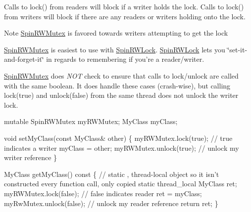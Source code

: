 Calls to lock() from readers will block if a writer holds the lock. Calls to lock() from writers will block if there are any readers or writers holding onto the lock.

\begin{DoxyNote}{Note}
\hyperlink{class_d_x_1_1_lock_free_1_1_spin_r_w_mutex}{Spin\-R\-W\-Mutex} is favored towards writers attempting to get the lock

\hyperlink{class_d_x_1_1_lock_free_1_1_spin_r_w_mutex}{Spin\-R\-W\-Mutex} is easiest to use with \hyperlink{class_d_x_1_1_lock_free_1_1_spin_r_w_lock}{Spin\-R\-W\-Lock}. \hyperlink{class_d_x_1_1_lock_free_1_1_spin_r_w_lock}{Spin\-R\-W\-Lock} lets you \char`\"{}set-\/it-\/and-\/forget-\/it\char`\"{} in regards to remembering if you're a reader/writer.

\hyperlink{class_d_x_1_1_lock_free_1_1_spin_r_w_mutex}{Spin\-R\-W\-Mutex} does {\itshape N\-O\-T} check to ensure that calls to lock/unlock are called with the same boolean. It does handle these cases (crash-\/wise), but calling lock(true) and unlock(false) from the same thread does not unlock the writer lock.
\end{DoxyNote}

\begin{DoxyCode}
\textcolor{keyword}{mutable} SpinRWMutex myRWMutex;
MyClass myClass;

\textcolor{keywordtype}{void} setMyClass(\textcolor{keyword}{const} MyClass& other)
\{
    myRWMutex.lock(\textcolor{keyword}{true}); \textcolor{comment}{// true indicates a writer}
    myClass = other;
    myRWMutex.unlock(\textcolor{keyword}{true}); \textcolor{comment}{// unlock my writer reference            }
\}

MyClass getMyClass()\textcolor{keyword}{ const}
\textcolor{keyword}{}\{
    \textcolor{comment}{// static , thread-local object so it isn't constructed every function call, only copied}
    \textcolor{keyword}{static} thread\_local MyClass ret;
    myRWMutex.lock(\textcolor{keyword}{false}); \textcolor{comment}{// false indicates reader}
    ret = myClass;
    myRwMutex.unlock(\textcolor{keyword}{false}); \textcolor{comment}{// unlock my reader reference}
    \textcolor{keywordflow}{return} ret;
\}
\end{DoxyCode}
 

